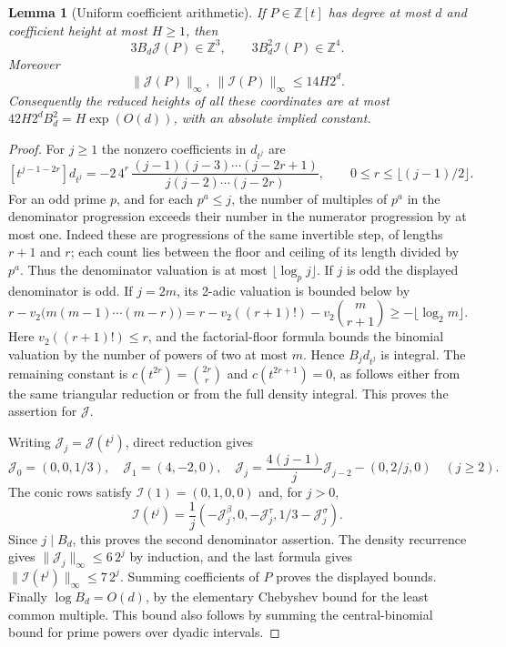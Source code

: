 \documentclass[11pt,a4paper]{article}
\numberwithin{equation}{section}
\newtheorem{lemma}[theorem]{Lemma}
\theoremstyle{definition}\newtheorem{definition}[theorem]{Definition}
\theoremstyle{remark}\newtheorem{remark}[theorem]{Remark}
\begin{document}
\begin{lemma}[Uniform coefficient arithmetic]\label{height:keio:lcm}
If $P\in\mathbb Z[t]$ has degree at most $d$ and coefficient height at
most $H\ge1$, then
\[
 3B_d\mathcal J(P)\in\mathbb Z^3,\qquad
 3B_d^2\mathcal I(P)\in\mathbb Z^4.
\]
Moreover
\[
 \|\mathcal J(P)\|_\infty,\ \|\mathcal I(P)\|_\infty
       \le 14H2^d.
\]
Consequently the reduced heights of all these coordinates are at most
$42H2^dB_d^2=H\exp(O(d))$, with an absolute implied constant.
\end{lemma}
\begin{proof}
For $j\ge1$ the nonzero coefficients in $d_{t^j}$ are
\[
 [t^{j-1-2r}]d_{t^j}
 =-2\,4^r\,
 \frac{(j-1)(j-3)\cdots(j-2r+1)}
      {j(j-2)\cdots(j-2r)},
 \qquad 0\le r\le\lfloor(j-1)/2\rfloor.
\]
For an odd prime $p$, and for each $p^a\le j$, the number of multiples
of $p^a$ in the denominator progression exceeds their number in the
numerator progression by at most one. Indeed these are progressions
of the same invertible step, of lengths $r+1$ and $r$; each count
lies between the floor and ceiling of its length divided by $p^a$.
Thus the denominator valuation is at most
$\lfloor\log_p j\rfloor$.
If $j$ is odd the displayed denominator is odd. If $j=2m$, its
2-adic valuation is bounded below by
\[
 r-v_2\big(m(m-1)\cdots(m-r)\big)
 =r-v_2((r+1)!)-v_2\binom m{r+1}
 \ge-\lfloor\log_2m\rfloor.
\]
Here $v_2((r+1)!)\le r$, and the factorial-floor formula bounds the
binomial valuation by the number of powers of two at most $m$.
Hence $B_jd_{t^j}$ is integral. The remaining constant is
$c(t^{2r})=\binom{2r}r$ and $c(t^{2r+1})=0$, as follows either from
the same triangular reduction or from the full density integral.
This proves the assertion for $\mathcal J$.

Writing $\mathcal J_j=\mathcal J(t^j)$, direct reduction gives
\[
 \mathcal J_0=(0,0,1/3),\quad \mathcal J_1=(4,-2,0),\quad
 \mathcal J_j=\frac{4(j-1)}j\mathcal J_{j-2}-(0,2/j,0)
 \quad(j\ge2).
\]
The conic rows satisfy $\mathcal I(1)=(0,1,0,0)$ and, for $j>0$,
\[
 \mathcal I(t^j)=\frac1j
       (-\mathcal J_j^\beta,0,-\mathcal J_j^\tau,
                                      1/3-\mathcal J_j^\sigma).
\]
Since $j\mid B_d$, this proves the second denominator assertion.
The density recurrence gives $\|\mathcal J_j\|_\infty\le6\,2^j$
by induction, and the last formula gives
$\|\mathcal I(t^j)\|_\infty\le7\,2^j$. Summing coefficients of
$P$ proves the displayed bounds. Finally $\log B_d=O(d)$, by the
elementary Chebyshev bound for the least common multiple. This bound
also follows by summing the central-binomial bound for prime powers
over dyadic intervals.
\end{proof}
\end{document}
